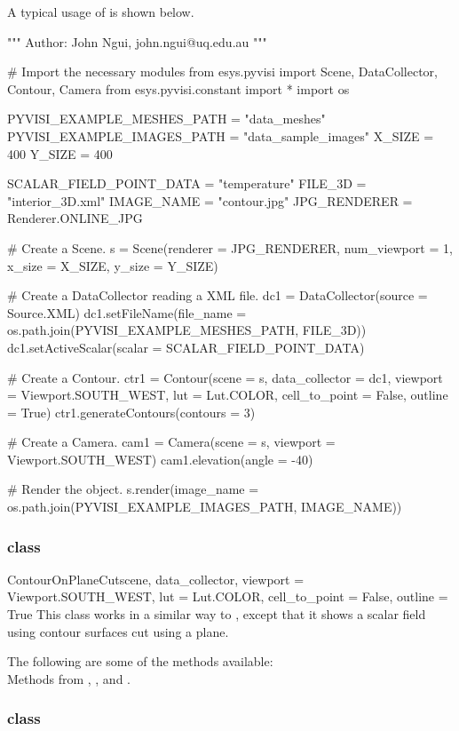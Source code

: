 A typical usage of \Contour is shown below.

\begin{python}
"""
Author: John Ngui, john.ngui@uq.edu.au
"""

# Import the necessary modules
from esys.pyvisi import Scene, DataCollector, Contour, Camera
from esys.pyvisi.constant import *
import os

PYVISI_EXAMPLE_MESHES_PATH = "data_meshes"
PYVISI_EXAMPLE_IMAGES_PATH = "data_sample_images"
X_SIZE = 400
Y_SIZE = 400

SCALAR_FIELD_POINT_DATA = "temperature"
FILE_3D = "interior_3D.xml"
IMAGE_NAME = "contour.jpg"
JPG_RENDERER = Renderer.ONLINE_JPG

# Create a Scene.
s = Scene(renderer = JPG_RENDERER, num_viewport = 1, x_size = X_SIZE, 
        y_size = Y_SIZE)

# Create a DataCollector reading a XML file.
dc1 = DataCollector(source = Source.XML)
dc1.setFileName(file_name = os.path.join(PYVISI_EXAMPLE_MESHES_PATH, FILE_3D))
dc1.setActiveScalar(scalar = SCALAR_FIELD_POINT_DATA)

# Create a Contour.
ctr1 = Contour(scene = s, data_collector = dc1, viewport = Viewport.SOUTH_WEST,
        lut = Lut.COLOR, cell_to_point = False, outline = True)
ctr1.generateContours(contours = 3)

# Create a Camera.
cam1 = Camera(scene = s, viewport = Viewport.SOUTH_WEST)
cam1.elevation(angle = -40)

# Render the object.
s.render(image_name = os.path.join(PYVISI_EXAMPLE_IMAGES_PATH, IMAGE_NAME))
\end{python}

\subsubsection{\ContourOnPlaneCut class}

\begin{classdesc}{ContourOnPlaneCut}{scene, data_collector,
viewport = Viewport.SOUTH_WEST, lut = Lut.COLOR, cell_to_point = False, 
outline = True}
This class works in a similar way to \MapOnPlaneCut, except that it shows a
scalar field using contour surfaces cut using a plane.
\end{classdesc}

The following are some of the methods available:\\
Methods from \ActorThreeD, \ContourModule, \Transform and \DataSetMapper. 

\subsubsection{\ContourOnPlaneClip class}


